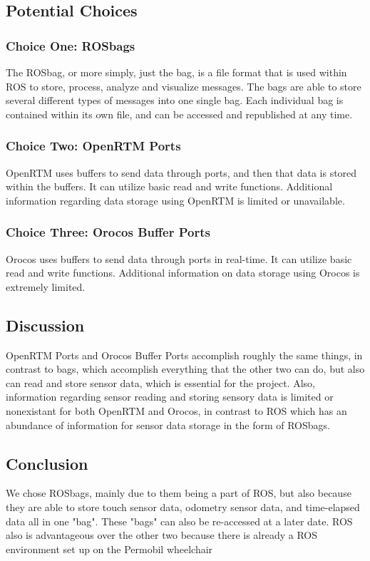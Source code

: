 \documentclass[onecolumn, draftclsnofoot,10pt, compsoc]{report}
\begin{document}
\subsection{Potential Choices}
\subsubsection{Choice One: ROSbags}
The ROSbag, or more simply, just the bag, is a file format that is used within ROS to store, process, analyze and visualize messages. The bags are able to store several different types of messages into one single bag. Each individual bag is contained within its own file, and can be accessed and republished at any time.\cite{Bags}

\subsubsection{Choice Two: OpenRTM Ports}
OpenRTM uses buffers to send data through ports, and then that data is stored within the buffers. It can utilize basic read and write functions. Additional information regarding data storage using OpenRTM is limited or unavailable.\cite{OpenRTM_Development}

\subsubsection{Choice Three: Orocos Buffer Ports}
Orocos uses buffers to send data through ports in real-time. It can utilize basic read and write functions. Additional information on data storage using Orocos is extremely limited.\cite{RTT_Data_Ports}

\subsection{Discussion}
OpenRTM Ports and Orocos Buffer Ports accomplish roughly the same things, in contrast to bags, which accomplish everything that the other two can do, but also can read and store sensor data, which is essential for the project. Also, information regarding sensor reading and storing sensory data is limited or nonexistant for both OpenRTM and Orocos, in contrast to ROS which has an abundance of information for sensor data storage in the form of ROSbags.

\subsection{Conclusion}
We chose ROSbags, mainly due to them being a part of ROS, but also because they are able to store touch sensor data, odometry sensor data, and time-elapsed data all in one "bag". These "bags" can also be re-accessed at a later date. ROS also is advantageous over the other two because there is already a ROS environment set up on the Permobil wheelchair
\end{document}
